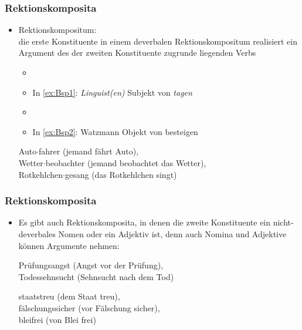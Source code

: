 \begin{frame}
\frametitle{Rektionskomposita}

\begin{itemize}
	\item Rektionskompositum: \\
	die erste Konstituente in einem deverbalen Rektionskompositum realisiert ein Argument des der zweiten Konstituente zugrunde liegenden Verbs
	
	\begin{itemize}
		\item[]
		\item In \ref{ex:Bsp1}: \emph{Linguist(en)} \ras Subjekt von \emph{tagen}
		\item[]
		\item In \ref{ex:Bsp2}: Watzmann \ras Objekt von besteigen
	\end{itemize}
	
	\ea	 Auto$\cdot$fahrer (jemand fährt Auto), \\
		 Wetter$\cdot$beobachter (jemand beobachtet das Wetter), \\
		 Rotkehlchen$\cdot$gesang (das Rotkehlchen singt)
	\z
		 
\end{itemize}


\end{frame}


\begin{frame}
\frametitle{Rektionskomposita}

\begin{itemize}
	\item Es gibt auch Rektionskomposita, in denen die zweite Konstituente ein nicht-deverbales Nomen oder ein Adjektiv ist, denn auch Nomina und Adjektive können Argumente nehmen:
	
	\ea Prüfungsangst (Angst vor der Prüfung), \\
		 Todessehnsucht (Sehnsucht nach dem Tod)
	\z
		 
	\ea staatstreu (dem Staat treu), \\
		 fälschungssicher (vor Fälschung sicher), \\
		 bleifrei (von Blei frei)
	\z
		 
\end{itemize}


\end{frame}



